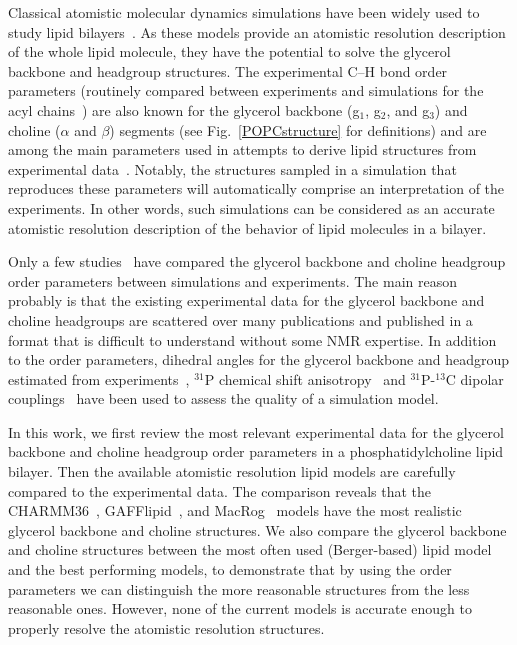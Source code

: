 \documentclass[journal=jpcbfk,manuscript=article]{achemso}
\begin{document}
Classical atomistic molecular dynamics simulations have been widely used to study  
lipid bilayers~\cite{tieleman97,klauda08,edholm08,tieleman10,piggot12,rabinovich13}. As these models provide an atomistic
resolution description of the whole lipid molecule, they have the potential to solve the glycerol backbone and 
headgroup structures. The experimental C--H bond order parameters
(routinely compared between experiments and simulations for the acyl chains~\cite{tieleman97,klauda08,edholm08,tieleman10,piggot12})
are also known for the glycerol backbone 
(g$_1$, g$_2$, and g$_3$) and choline ($\alpha$ and $\beta$) segments (see Fig.~\ref{POPCstructure} for definitions) and are among the main parameters used in
attempts to derive lipid structures from experimental data~\cite{seelig77b,skarjune79,jacobs80,davis83,akutsu91,hong95b,semchyschyn04}.
Notably, the structures sampled in a simulation that reproduces these 
parameters will automatically comprise an interpretation of the experiments. In other words, such simulations can be considered as an accurate atomistic resolution description of
the behavior of lipid molecules in a bilayer.

Only a few studies~\cite{shinoda97,hogberg08,castro08,klauda10,kapla12,dickson12,poger12,ferreira13,chowdhary13,maciejewski14}
have compared
the glycerol backbone and choline headgroup order parameters between simulations and experiments. 
The main reason probably is that the existing experimental data for the glycerol backbone
and choline headgroups are scattered over many publications and published in a format that is difficult to understand without some NMR expertise. 
In addition to the order parameters, dihedral angles for the glycerol backbone and headgroup estimated 
from experiments~\cite{robinson94,essex94,kothekar96,hyvonen97,shinoda97,duong99}, 
$^{31}$P chemical shift anisotropy~\cite{chowdhary13} and $^{31}$P-$^{13}$C dipolar couplings~\cite{prakash10}
have been used to assess the quality of a simulation model.

In this work, we first review the most relevant experimental data for the glycerol backbone and choline headgroup order parameters
in a phosphatidylcholine lipid bilayer. Then the available atomistic resolution lipid models are carefully compared to the 
experimental data. The comparison reveals that the CHARMM36~\cite{klauda10}, GAFFlipid~\cite{dickson12}, and MacRog~\cite{maciejewski14} models
have the most realistic glycerol backbone and choline structures. We also compare the glycerol backbone and choline 
structures between the most often used (Berger-based) lipid model~\cite{berger97} 
and the best performing models, to demonstrate that by using the 
order parameters we can distinguish the more reasonable structures from the less reasonable ones. However, none of the current models 
is accurate enough to properly resolve the atomistic resolution structures.
\end{document}
